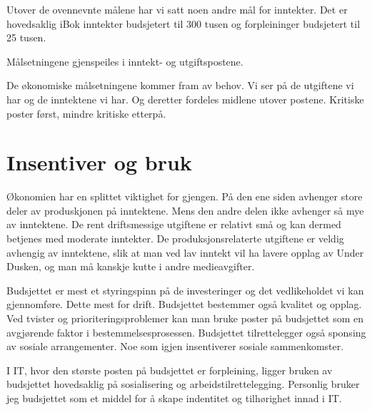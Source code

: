\documentclass[12pt, a4paper]{article}
\begin{document}
Utover de ovennevnte målene har vi satt noen andre mål for inntekter. Det er
hovedsaklig iBok inntekter budsjetert til 300 tusen og forpleininger budsjetert
til 25 tusen. 

Målsetningene gjenspeiles i inntekt- og utgiftspostene. 

De økonomiske målsetningene kommer fram av behov. Vi ser på de utgiftene vi har
og de inntektene vi har. Og deretter fordeles midlene utover postene. Kritiske
poster først, mindre kritiske etterpå.  

\section{Insentiver og bruk}
Økonomien har en splittet viktighet for gjengen. På den ene siden avhenger
store deler av produskjonen på inntektene. Mens den andre delen ikke avhenger
så mye av inntektene. De rent driftsmessige utgiftene er relativt små og kan
dermed betjenes med moderate inntekter. De produksjonsrelaterte utgiftene er
veldig avhengig av inntektene, slik at man ved lav inntekt vil ha lavere opplag
av Under Dusken, og man må kanskje kutte i andre medieavgifter. 

Budsjettet er mest et styringspinn på de investeringer og det vedlikeholdet vi
kan gjennomføre. Dette mest for drift. Budsjettet bestemmer også kvalitet og
opplag. Ved tvister og prioriteringsproblemer kan man bruke poster på
budsjettet som en avgjørende faktor i bestemmelsesprosessen.   
Budsjettet tilrettelegger også sponsing av sosiale arrangementer. Noe som igjen
insentiverer sosiale sammenkomster.  

I IT, hvor den største posten på budsjettet er forpleining, ligger bruken av
budsjettet hovedsaklig på sosialisering og arbeidstilrettelegging. 
Personlig bruker jeg budsjettet som et middel for å skape indentitet og
tilhørighet innad i IT.
\end{document}
